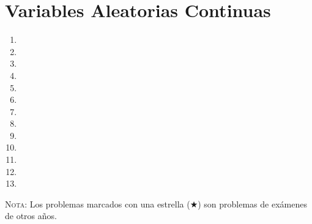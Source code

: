 \documentclass[a4paper,titlepage]{article}
\begin{document}
  \section{Variables Aleatorias Continuas}
  \begin{enumerate}[leftmargin=*,resume]
  \item {}
  \item {}
  \item {}
  \item {}
  \item {}
  \item {}
  \item {}
  \item {}
  \item {}
  \item {}
  \item {}
  \item {}
  \item {}
  \end{enumerate}
  \vspace{2cm}
  
  \textsc{Nota}: Los problemas marcados con una estrella ($\bigstar$) son problemas de
  exámenes de otros años.
  
\end{document}
